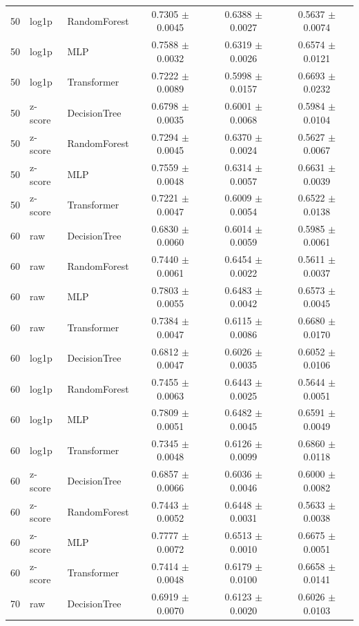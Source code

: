 \begin{longtable}{rllccc}
50 & log1p & RandomForest & 0.7305 $\pm$ 0.0045 & 0.6388 $\pm$ 0.0027 & 0.5637 $\pm$ 0.0074 \\
50 & log1p & MLP & 0.7588 $\pm$ 0.0032 & 0.6319 $\pm$ 0.0026 & 0.6574 $\pm$ 0.0121 \\
50 & log1p & Transformer & 0.7222 $\pm$ 0.0089 & 0.5998 $\pm$ 0.0157 & 0.6693 $\pm$ 0.0232 \\
50 & z-score & DecisionTree & 0.6798 $\pm$ 0.0035 & 0.6001 $\pm$ 0.0068 & 0.5984 $\pm$ 0.0104 \\
50 & z-score & RandomForest & 0.7294 $\pm$ 0.0045 & 0.6370 $\pm$ 0.0024 & 0.5627 $\pm$ 0.0067 \\
50 & z-score & MLP & 0.7559 $\pm$ 0.0048 & 0.6314 $\pm$ 0.0057 & 0.6631 $\pm$ 0.0039 \\
50 & z-score & Transformer & 0.7221 $\pm$ 0.0047 & 0.6009 $\pm$ 0.0054 & 0.6522 $\pm$ 0.0138 \\
60 & raw & DecisionTree & 0.6830 $\pm$ 0.0060 & 0.6014 $\pm$ 0.0059 & 0.5985 $\pm$ 0.0061 \\
60 & raw & RandomForest & 0.7440 $\pm$ 0.0061 & 0.6454 $\pm$ 0.0022 & 0.5611 $\pm$ 0.0037 \\
60 & raw & MLP & 0.7803 $\pm$ 0.0055 & 0.6483 $\pm$ 0.0042 & 0.6573 $\pm$ 0.0045 \\
60 & raw & Transformer & 0.7384 $\pm$ 0.0047 & 0.6115 $\pm$ 0.0086 & 0.6680 $\pm$ 0.0170 \\
60 & log1p & DecisionTree & 0.6812 $\pm$ 0.0047 & 0.6026 $\pm$ 0.0035 & 0.6052 $\pm$ 0.0106 \\
60 & log1p & RandomForest & 0.7455 $\pm$ 0.0063 & 0.6443 $\pm$ 0.0025 & 0.5644 $\pm$ 0.0051 \\
60 & log1p & MLP & 0.7809 $\pm$ 0.0051 & 0.6482 $\pm$ 0.0045 & 0.6591 $\pm$ 0.0049 \\
60 & log1p & Transformer & 0.7345 $\pm$ 0.0048 & 0.6126 $\pm$ 0.0099 & 0.6860 $\pm$ 0.0118 \\
60 & z-score & DecisionTree & 0.6857 $\pm$ 0.0066 & 0.6036 $\pm$ 0.0046 & 0.6000 $\pm$ 0.0082 \\
60 & z-score & RandomForest & 0.7443 $\pm$ 0.0052 & 0.6448 $\pm$ 0.0031 & 0.5633 $\pm$ 0.0038 \\
60 & z-score & MLP & 0.7777 $\pm$ 0.0072 & 0.6513 $\pm$ 0.0010 & 0.6675 $\pm$ 0.0051 \\
60 & z-score & Transformer & 0.7414 $\pm$ 0.0048 & 0.6179 $\pm$ 0.0100 & 0.6658 $\pm$ 0.0141 \\
70 & raw & DecisionTree & 0.6919 $\pm$ 0.0070 & 0.6123 $\pm$ 0.0020 & 0.6026 $\pm$ 0.0103 \\

\end{longtable}
